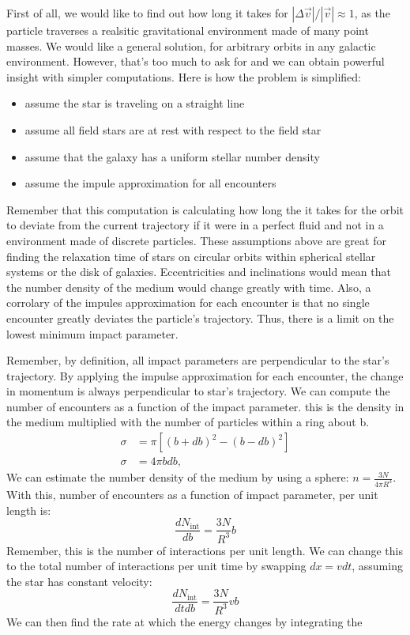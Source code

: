         First of all, we would like to find out how long it takes for $|\Delta \vec{v}|/|\vec{v}|\approx 1$, as the particle traverses a realsitic gravitational environment made of many point masses. We would like a general solution, for arbitrary orbits in any galactic environment. However, that's too much to ask for and we can obtain powerful insight with simpler computations. Here is how the problem is simplified:
        \begin{itemize}
            \item assume the star is traveling on a straight line 
            \item assume all field stars are at rest with respect to the field star 
            \item assume that the galaxy has a uniform stellar number density
            \item assume the impule approximation for all encounters
        \end{itemize}
        
        Remember that this computation is calculating how long the it takes for the orbit to deviate from the current trajectory if it were in a perfect fluid and not in a environment made of discrete particles. These assumptions above are great for finding the relaxation time of stars on circular orbits within spherical stellar systems or the disk of galaxies. Eccentricities and inclinations would mean that the number density of the medium would change greatly with time. Also, a corrolary of the impules approximation for each encounter is that no single encounter greatly deviates the particle's trajectory. Thus, there is a limit on the lowest minimum impact parameter. 

        Remember, by definition, all impact parameters are perpendicular to the star's trajectory. By applying the impulse approximation for each encounter, the change in momentum is always perpendicular to star's trajectory. We can compute the number of encounters as a function of the impact parameter. this is the density in the medium multiplied with the number of particles within a ring about b. 
        \begin{align}
            \sigma &= \pi \left[(b+db)^2-(b-db)^2 \right]\\
            \sigma &= 4\pi bdb,
        \end{align}
        We can estimate the number density of the medium by using a sphere: $n=\frac{3N}{4\pi R^3}$. With this, number of encounters as a function of impact parameter, per unit length is: 
        \begin{equation}
            \frac{d N_\mathrm{int}}{db} = \frac{3N}{R^3} b
        \end{equation}
        Remember, this is the number of interactions per unit length. We can change this to the total number of interactions per unit time by swapping $dx=vdt$, assuming the star has constant velocity: 
        \begin{equation}
            \frac{d N_\mathrm{int}}{dtdb} = \frac{3N}{R^3} vb
        \end{equation}
        We can then find the rate at which the energy changes by integrating the 

